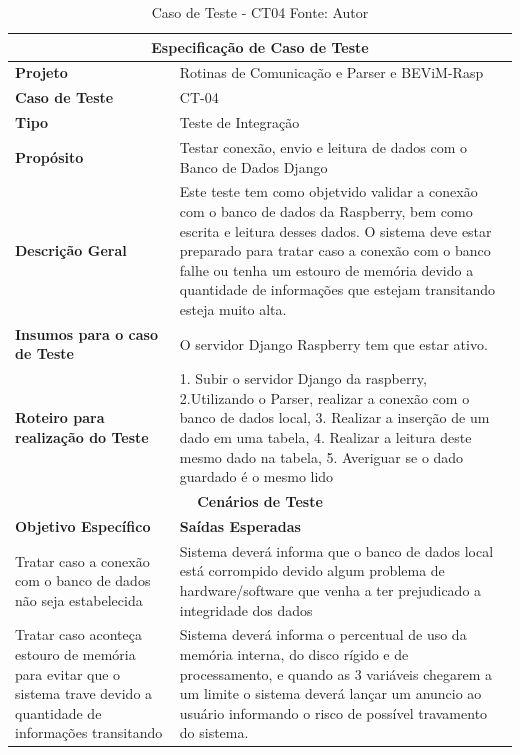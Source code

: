 \begin{table}[H]
    \begin{center}
        \begin{tabular}{|p{5cm}|p{12cm}|}
            \hline
            \multicolumn{2}{|c|}{\textbf{Especificação de Caso de Teste}} \\ \hline
                \textbf{Projeto}                                        & Rotinas de Comunicação e Parser e BEViM-Rasp\\ \hline
                \textbf{Caso de Teste}                             & CT-04 \\ \hline
                \textbf{Tipo}                                             & Teste de Integração \\ \hline
                \textbf{Propósito}                                     & Testar conexão, envio e leitura de dados com o Banco de Dados Django \\ \hline
                \textbf{Descrição Geral}                           & Este teste tem como objetvido validar a conexão com o banco de dados da Raspberry, bem como escrita e leitura desses dados. O sistema deve estar preparado para tratar caso a conexão com o banco falhe ou tenha um estouro de memória devido a quantidade de informações que estejam transitando esteja muito alta. \\ \hline
                \textbf{Insumos para o caso de Teste}    & O servidor Django Raspberry tem que estar ativo. \\ \hline
                \textbf{Roteiro para realização do Teste}&  1. Subir o servidor Django da raspberry, 2.Utilizando o Parser, realizar a conexão com o banco de dados local, 3. Realizar a inserção de um dado em uma tabela, 4. Realizar a leitura deste mesmo dado na tabela, 5. Averiguar se o dado guardado é o mesmo lido  \\ \hline
            \multicolumn{2}{|c|}{\textbf{Cenários de Teste}} \\ \hline
                \textbf{Objetivo Específico}                      & \textbf{Saídas Esperadas} \\ \hline
                Tratar caso a conexão com o banco de dados não seja estabelecida & Sistema deverá informa que o banco de dados local está corrompido devido algum problema de hardware/software que venha a ter prejudicado a integridade dos dados \\ \hline
                Tratar caso aconteça estouro de memória para evitar que o sistema trave devido a quantidade de informações transitando & Sistema deverá informa o percentual de uso da memória interna, do disco rígido e de processamento, e quando as 3 variáveis chegarem a um limite o sistema deverá lançar um anuncio ao usuário informando o risco de possível travamento do sistema. \\ \hline
        \end{tabular}
    \end{center}
    \caption[Caso de Teste - CT04]{Caso de Teste - CT04
    \protect Fonte: Autor}
    \label{CT-04}
\end{table}


